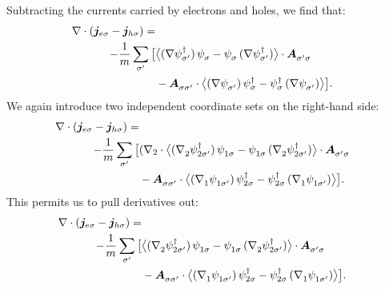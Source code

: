 Subtracting the currents carried by electrons and holes, we find that:
\begin{equation}
  \begin{aligned}
  \nabla \cdot (\bm{j}_{e\sigma} - \bm{j}_{h\sigma}) = \\
  -\frac{1}{m} \sum_{\sigma'}
  \big[ 
      & \avg[\big]{(\nabla \hc{\psi_{\sigma'}})\, \pc{\psi_{\sigma}} - \pc{\psi_{\sigma}}\, (\nabla \hc{\psi_{\sigma'}})} \cdot \pc{\bm{A}_{\sigma'\sigma}}\\
      &- \pc{\bm{A}_{\sigma\sigma'}} \cdot \avg[\big]{ (\nabla \pc{\psi_{\sigma'}})\, \hc{\psi_{\sigma}} - \hc{\psi_{\sigma}}\, (\nabla \pc{\psi_{\sigma'}}) }
  \big].
  \end{aligned}
\end{equation}
We again introduce two independent coordinate sets on the right-hand side:
\begin{equation}
  \begin{aligned}
  \nabla \cdot (\bm{j}_{e\sigma} - \bm{j}_{h\sigma}) = \\
  -\frac{1}{m} \sum_{\sigma'}
  \big[ 
  & (\nabla_2\cdot\avg[\big]{(\pc{\nabla_2} \hc{\psi_{2\sigma'}})\, \pc{\psi_{1\sigma}} - \pc{\psi_{1\sigma}}\, (\pc{\nabla_2} \hc{\psi_{2\sigma'}})} \cdot \pc{\bm{A}_{\sigma'\sigma}}\\
    &- \pc{\bm{A}_{\sigma\sigma'}} \cdot \avg[\big]{ (\pc{\nabla}_1 \pc{\psi_{1\sigma'}})\, \hc{\psi_{2\sigma}} - \hc{\psi_{2\sigma}}\, (\pc{\nabla_1} \pc{\psi_{1\sigma'}}) }
  \big].
  \end{aligned}
\end{equation}
This permits us to pull derivatives out:
\begin{equation}
  \begin{aligned}
  \nabla \cdot (\bm{j}_{e\sigma} - \bm{j}_{h\sigma}) = \\
  -\frac{1}{m} \sum_{\sigma'}
  \big[ 
    & \avg[\big]{(\pc{\nabla_2} \hc{\psi_{2\sigma'}})\, \pc{\psi_{1\sigma}} - \pc{\psi_{1\sigma}}\, (\pc{\nabla_2} \hc{\psi_{2\sigma'}})} \cdot \pc{\bm{A}_{\sigma'\sigma}}\\
    &- \pc{\bm{A}_{\sigma\sigma'}} \cdot \avg[\big]{ (\pc{\nabla}_1 \pc{\psi_{1\sigma'}})\, \hc{\psi_{2\sigma}} - \hc{\psi_{2\sigma}}\, (\pc{\nabla_1} \pc{\psi_{1\sigma'}}) }
  \big].
  \end{aligned}
\end{equation}



